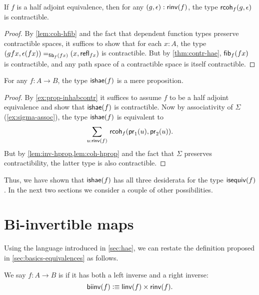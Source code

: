 \begin{lem}\label{lem:coh-hprop}
  If $f$ is a half adjoint equivalence, then for any $(g,\epsilon) : \rinv(f)$, the type $\rcoh{f}{g}{\epsilon}$ is contractible.
\end{lem}
\begin{proof}
  By \cref{lem:coh-hfib} and the fact that dependent function types preserve contractible spaces, it suffices to show that for each $x:A$, the type $\id[\hfib{f}{fx}]{(gfx,\epsilon(fx))}{(x,\refl{fx})}$ is contractible.
  But by \cref{thm:contr-hae}, $\hfib{f}{fx}$ is contractible, and any path space of a contractible space is itself contractible.
\end{proof}

\begin{thm}\label{thm:hae-hprop}
  For any $f : A \to B$, the type $\ishae(f)$ is a mere proposition.
\end{thm}
\begin{proof}
  By \cref{ex:prop-inhabcontr} it suffices to assume $f$ to be a half adjoint equivalence and show that $\ishae(f)$ is contractible.
  Now by associativity of $\Sigma$ (\cref{ex:sigma-assoc}), the type $\ishae(f)$ is equivalent to
  \[\sm{u : \rinv(f)} \rcoh{f}{\proj{1}(u)}{\proj{2}(u)}.\]
  But by \cref{lem:inv-hprop,lem:coh-hprop} and the fact that $\Sigma$ preserves contractibility, the latter type is also contractible.
\end{proof}

Thus, we have shown that $\ishae(f)$ has all three desiderata for the type $\isequiv(f)$.
In the next two sections we consider a couple of other possibilities.

%
%
%

\section{Bi-invertible maps}
\label{sec:biinv}

%
%
%

Using the language introduced in \cref{sec:hae}, we can restate the definition proposed in \cref{sec:basics-equivalences} as follows.

\begin{defn}\label{defn:biinv}
  We say $f:A\to B$ is 
  if it has both a left inverse and a right inverse:
  \[ \biinv (f) \defeq \linv(f) \times \rinv(f). \]
\end{defn}

